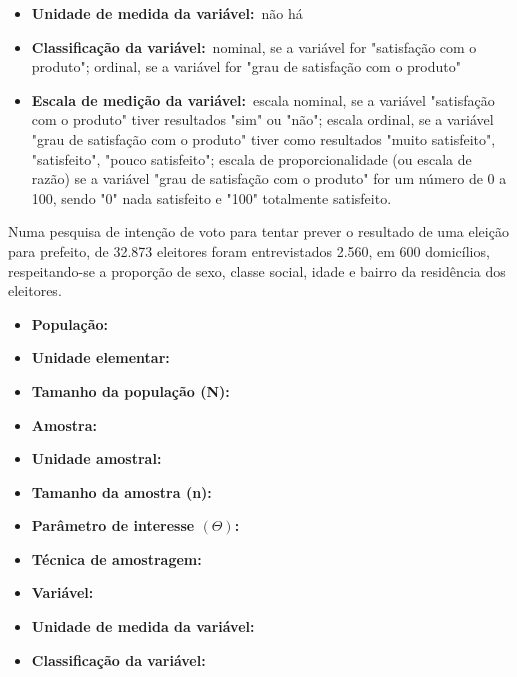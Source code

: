 \begin{enumerate}
\begin{itemize}
		\item \textbf{Unidade de medida da variável:}~não há
		
		\item \textbf{Classificação da variável:}~nominal, se a variável for "satisfação com o produto"; ordinal, se a variável
for "grau de satisfação com o produto"
		
		\item \textbf{Escala de medição da variável:}~escala nominal, se a variável "satisfação com o produto" tiver resultados
"sim" ou "não"; escala ordinal, se a variável "grau de satisfação com o produto" tiver como resultados
"muito satisfeito", "satisfeito", "pouco satisfeito"; escala de proporcionalidade (ou escala de razão) se a
variável "grau de satisfação com o produto" for um número de 0 a 100, sendo "0" nada satisfeito e "100"
totalmente satisfeito.
	\end{itemize}

	\subitem Numa pesquisa de intenção de voto para tentar prever o resultado de uma eleição para
prefeito, de 32.873 eleitores foram entrevistados 2.560, em 600 domicílios, respeitando-se a proporção de sexo, classe social, idade e bairro da residência dos eleitores.
	
	\begin{itemize}	
		\item \textbf{População:}~
			
		\item \textbf{Unidade elementar:}~
		
		\item \textbf{Tamanho da população (N):}~
		
		\item \textbf{Amostra:}~
		
		\item \textbf{Unidade amostral:}~
		
		\item \textbf{Tamanho da amostra (n):}~
		
		\item \textbf{Parâmetro de interesse $\left(\varTheta\right)$:}~
		
		\item \textbf{Técnica de amostragem:}~
		
		\item \textbf{Variável:}~
		
		\item \textbf{Unidade de medida da variável:}~
		
		\item \textbf{Classificação da variável:}~
		

\end{itemize}
\end{enumerate}
